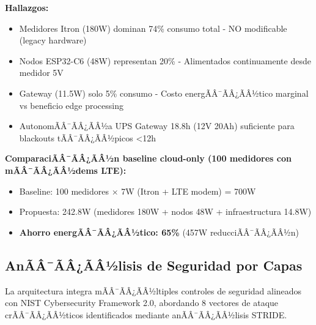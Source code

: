 \textbf{Hallazgos:}

\begin{itemize}
    \item Medidores Itron (180W) dominan 74\% consumo total - NO modificable (legacy hardware)
    \item Nodos ESP32-C6 (48W) representan 20\% - Alimentados continuamente desde medidor 5V
    \item Gateway (11.5W) solo 5\% consumo - Costo energÃÂ¯ÃÂ¿ÃÂ½tico marginal vs beneficio edge processing
    \item AutonomÃÂ¯ÃÂ¿ÃÂ½a UPS Gateway 18.8h (12V 20Ah) suficiente para blackouts tÃÂ¯ÃÂ¿ÃÂ½picos <12h
\end{itemize}

\textbf{ComparaciÃÂ¯ÃÂ¿ÃÂ½n baseline cloud-only (100 medidores con mÃÂ¯ÃÂ¿ÃÂ½dems LTE):}

\begin{itemize}
    \item Baseline: 100 medidores $\times$ 7W (Itron + LTE modem) = 700W
    \item Propuesta: 242.8W (medidores 180W + nodos 48W + infraestructura 14.8W)
    \item \textbf{Ahorro energÃÂ¯ÃÂ¿ÃÂ½tico: 65\%} (457W reducciÃÂ¯ÃÂ¿ÃÂ½n)
\end{itemize}

\subsection{AnÃÂ¯ÃÂ¿ÃÂ½lisis de Seguridad por Capas}
\label{sec:impl-security-analysis}

La arquitectura integra mÃÂ¯ÃÂ¿ÃÂ½ltiples controles de seguridad alineados con NIST Cybersecurity Framework 2.0, abordando 8 vectores de ataque crÃÂ¯ÃÂ¿ÃÂ½ticos identificados mediante anÃÂ¯ÃÂ¿ÃÂ½lisis STRIDE.

